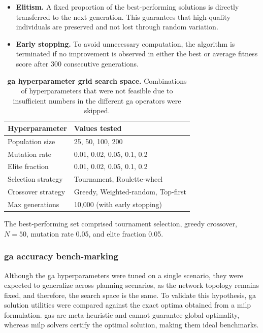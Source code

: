 {\begin{itemize}
        \item \textbf{Elitism.} A fixed proportion of the best-performing solutions is directly transferred to the next generation. This guarantees that high-quality individuals are preserved and not lost through random variation.

        \item \textbf{Early stopping.} To avoid unnecessary computation, the algorithm is terminated if no improvement is observed in either the best or average fitness score after 300 consecutive generations.
        \end{itemize}
        }%


        \begin{table}[!htbp]
        \centering
        \caption[GA hyperparameter grid search space]{
            \textbf{\ac{ga} hyperparameter grid search space.} 
            Combinations of hyperparameters that were not feasible due to insufficient numbers in the different \ac{ga} operators were skipped.
        }
        \label{table:ga_grid}
        \footnotesize
            \begin{tabular}{ll}
            \toprule
            \textbf{Hyperparameter} & \textbf{Values tested} \\
            \midrule
            Population size & 25, 50, 100, 200 \\
            Mutation rate & 0.01, 0.02, 0.05, 0.1, 0.2 \\
            Elite fraction & 0.01, 0.02, 0.05, 0.1, 0.2 \\
            Selection strategy & Tournament, Roulette-wheel \\
            Crossover strategy & Greedy, Weighted-random, Top-first \\
            Max generations & 10,000 (with early stopping)\\
            \bottomrule
            \end{tabular}
        \end{table}

        The best‐performing set comprised tournament selection, greedy crossover, \(N=50\), mutation rate 0.05, and elite fraction 0.05.  


        \subsubsection[GA accuracy bench-marking]{\ac{ga} accuracy bench-marking}
        \label{GA_vs_MILP}

        Although the \ac{ga} hyperparameters were tuned on a single scenario, they were expected to generalize across planning scenarios, as the network topology remains fixed, and therefore, the search space is the same. To validate this hypothesis, \ac{ga} solution utilities were compared against the exact optima obtained from a \ac{milp} formulation. \acp{ga} are meta-heuristic and cannot guarantee global optimality, whereas \ac{milp} solvers certify the optimal solution, making them ideal benchmarks.

